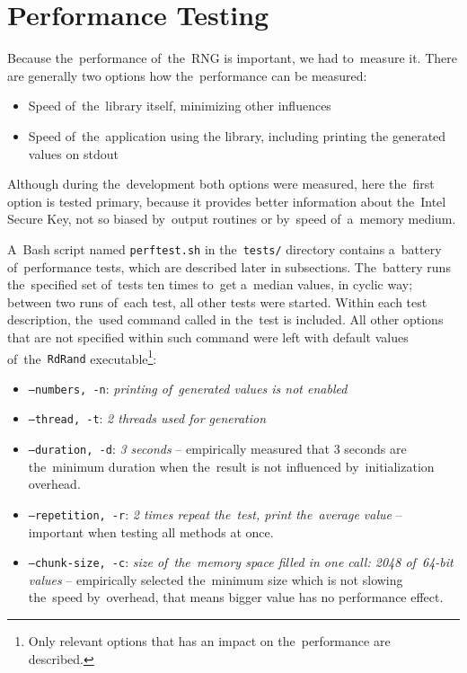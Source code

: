 \section{Performance Testing} \label{sec:testing:performance-testing}
\par{
Because the~performance of~the~RNG is important, we had to~measure it. There are generally two options how the~performance can be measured:
\begin{itemize}
 \item Speed of~the~library itself, minimizing other influences
 \item Speed of~the~application using the library, including printing the generated values on stdout
\end{itemize}
Although during the~development both options were measured, here the~first option is tested primary, because it provides better information about the~Intel Secure Key, not so biased by~output routines or by~speed of~a~memory medium. 
}

\par{
A~Bash script named {\tt perftest.sh} in the~{\tt tests/} directory contains a~battery of~performance tests, which are described later in subsections. The~battery runs the~specified set of~tests ten times to~get a~median values, in cyclic way; between two runs of~each test, all other tests were started. Within each test description, the~used command called in the~test is included. All other options that are not specified within such command were left with default values of~the~{\tt RdRand} executable\footnote{Only relevant options that has an impact on the~performance are described.}:
}

\begin{itemize}
 \item {\tt --numbers, -n}: {\em printing of~generated values is not enabled}
 \item {\tt --thread, -t}: {\em 2 threads used for generation}
 \item {\tt --duration, -d}: {\em 3 seconds} -- empirically measured that 3 seconds are the~minimum duration when the~result is not influenced by~initialization overhead.
 \item {\tt --repetition, -r}: {\em 2 times repeat the~test, print the~average value} -- important when testing all methods at once.
 \item {\tt --chunk-size, -c}: {\em size of~the~memory space filled in one call: 2048 of~64-bit values} -- empirically selected the~minimum size which is not slowing the~speed by~overhead, that means bigger value has no performance effect.
\end{itemize}

